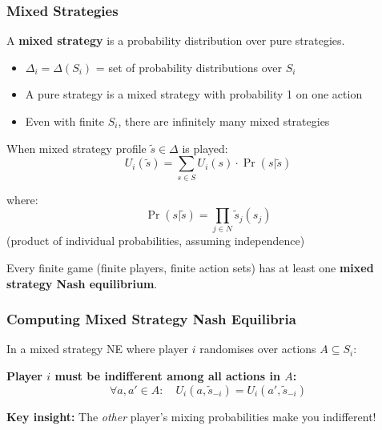 \bigseparator

\subsubsection{Mixed Strategies}

\begin{defbox}
A \textbf{mixed strategy} is a probability distribution over pure strategies.

\begin{itemize}
  \item $\Delta_i = \Delta(S_i)$ = set of probability distributions over $S_i$
  \item A pure strategy is a mixed strategy with probability 1 on one action
  \item Even with finite $S_i$, there are infinitely many mixed strategies
\end{itemize}
\end{defbox}

\begin{defbox}
When mixed strategy profile $\tilde{s} \in \Delta$ is played:
\[
U_i(\tilde{s}) = \sum_{s \in S} U_i(s) \cdot \Pr(s | \tilde{s})
\]

where:
\[
\Pr(s | \tilde{s}) = \prod_{j \in N} \tilde{s}_j(s_j)
\]
(product of individual probabilities, assuming independence)
\end{defbox}

\begin{thmbox}
Every finite game (finite players, finite action sets) has at least one \textbf{mixed strategy Nash equilibrium}.
\end{thmbox}

\separator

\subsubsection{Computing Mixed Strategy Nash Equilibria}

\begin{thmbox}
In a mixed strategy NE where player $i$ randomises over actions $A \subseteq S_i$:

\textbf{Player $i$ must be indifferent among all actions in $A$:}
\[
\forall a, a' \in A: \quad U_i(a, \tilde{s}_{-i}) = U_i(a', \tilde{s}_{-i})
\]

\textbf{Key insight:} The \textit{other} player's mixing probabilities make you indifferent!
\end{thmbox}

